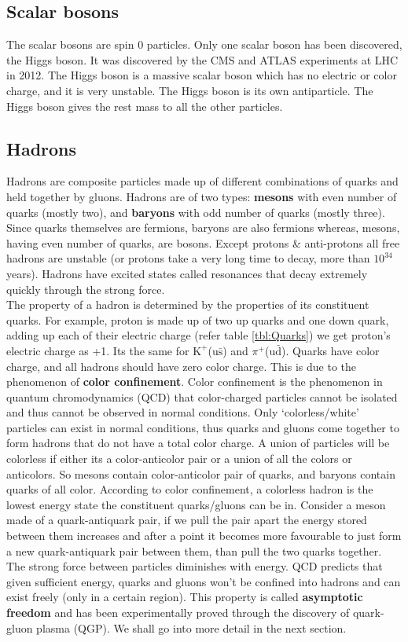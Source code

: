 \documentclass[12pt,a4paper,twoside]{report}
\begin{document}
\subsection{Scalar bosons}
The scalar bosons are spin 0 particles. Only one scalar boson has been discovered, the Higgs boson. It was discovered by the CMS and ATLAS experiments at LHC in 2012.\cite{Ref:higgs-ATLAS}\cite{Ref:higgs-CMS} The Higgs boson is a massive scalar boson which has no electric or color charge, and it is very unstable. The Higgs boson is its own antiparticle. The Higgs boson gives the rest mass to all the other particles.
\subsection{Hadrons}
Hadrons are composite particles made up of different combinations of quarks and held together by gluons. Hadrons are of two types: \textbf{mesons} with even number of quarks (mostly two), and \textbf{baryons} with odd number of quarks (mostly three). Since quarks themselves are fermions, baryons are also fermions whereas, mesons, having even number of quarks, are bosons. Except protons \& anti-protons all free hadrons are unstable (or protons take a very long time to decay, more than $10^{34}$ years). Hadrons have excited states called resonances that decay extremely quickly through the strong force.\\

The property of a hadron is determined by the properties of its constituent quarks. For example, proton is made up of two up quarks and one down quark, adding up each of their electric charge (refer table \ref{tbl:Quarks}) we get proton's electric charge as +1. Its the same for $\mathrm{K}^+$(u$\bar{\mathrm{s}}$) and $\pi^+$(u$\bar{\mathrm{d}}$). Quarks have color charge, and all hadrons should have zero color charge. This is due to the phenomenon of \textbf{color confinement}. Color confinement is the phenomenon in quantum chromodynamics (QCD) that color-charged particles cannot be isolated and thus cannot be observed in normal conditions. Only `colorless/white' particles can exist in normal conditions, thus quarks and gluons come together to form hadrons that do not have a total color charge. A union of particles will be colorless if either its a color-anticolor pair or a union of all the colors or anticolors. So mesons contain color-anticolor pair of quarks, and baryons contain quarks of all color. According to color confinement, a colorless hadron is the lowest energy state the constituent quarks/gluons can be in. Consider a meson made of a quark-antiquark pair, if we pull the pair apart the energy stored between them increases and after a point it becomes more favourable to just form a new quark-antiquark pair between them, than pull the two quarks together.\\
The strong force between particles diminishes with energy. QCD predicts that given sufficient energy, quarks and gluons won't be confined into hadrons and can exist freely (only in a certain region). This property is called \textbf{asymptotic freedom} and has been experimentally proved through the discovery of quark-gluon plasma (QGP). We shall go into more detail in the next section.\\
\end{document}
